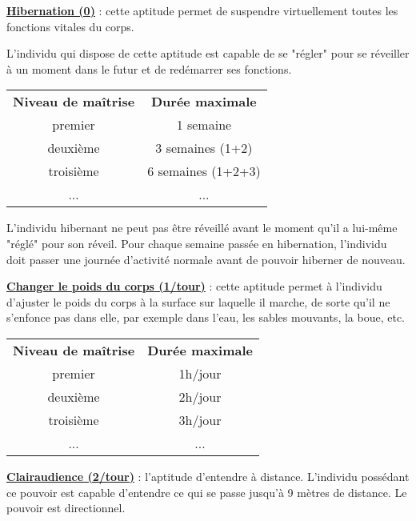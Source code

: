 \label{guerrier-hibernation}\textbf{\uline{Hibernation (0)}} : cette aptitude permet de suspendre virtuellement toutes les fonctions vitales du corps.

\bigskip

L'individu qui dispose de cette aptitude est capable de se "régler" pour se réveiller à un moment dans le futur et de redémarrer ses fonctions.

\bigskip

\begin{tabular}{cc}
\textbf{Niveau de maîtrise} & \textbf{Durée maximale} \\
premier     & 1 semaine \\
deuxième    & 3 semaines (1+2) \\
troisième   & 6 semaines (1+2+3) \\
...         & ... \\
\end{tabular}

\bigskip

L'individu hibernant ne peut pas être réveillé avant le moment qu'il a lui-même "réglé" pour son réveil. Pour chaque semaine passée en hibernation, l'individu doit passer une journée d'activité normale avant de pouvoir hiberner de nouveau.

\bigskip

\label{guerrier-changer-poids}\textbf{\uline{Changer le poids du corps (1/tour)}} : cette aptitude permet à l'individu d'ajuster le poids du corps à la surface sur laquelle il marche, de sorte qu'il ne s'enfonce pas dans elle, par exemple dans l'eau, les sables mouvants, la boue, etc.

\bigskip

\begin{tabular}{cc}
\textbf{Niveau de maîtrise} & \textbf{Durée maximale} \\
premier     & 1h/jour \\
deuxième    & 2h/jour \\
troisième   & 3h/jour \\
...         & ... \\
\end{tabular}

\bigskip

\label{guerrier-clairaudience}\textbf{\uline{Clairaudience (2/tour)}} : l'aptitude d'entendre à distance. L'individu possédant ce pouvoir est capable d'entendre ce qui se passe jusqu'à 9 mètres de distance. Le pouvoir est directionnel.

